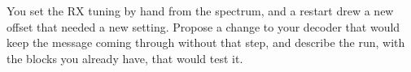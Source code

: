 \documentclass{exam}
\begin{document}
\begin{Form}
\begin{questions}
\newpage
\question You set the RX tuning by hand from the spectrum, and a restart drew a new offset that
needed a new setting. Propose a change to your decoder that would keep the message coming
through without that step, and describe the run, with the blocks you already have, that would
test it.
	\begin{solution}[3.0in]\end{solution}

\end{questions}

\docstatement

\end{Form}
\end{document}
